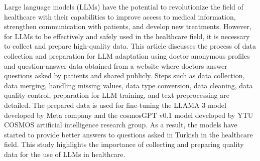 \sloppy
Large language models (LLMs) have the potential to revolutionize the field of healthcare with their capabilities to improve access to medical information, strengthen communication with patients, and develop new treatments. However, for LLMs to be effectively and safely used in the healthcare field, it is necessary to collect and prepare high-quality data. This article discusses the process of data collection and preparation for LLM adaptation using doctor anonymous profiles and question-answer data obtained from a website where doctors answer questions asked by patients and shared publicly. Steps such as data collection, data merging, handling missing values, data type conversion, data cleaning, data quality control, preparation for LLM training, and text preprocessing are detailed. The prepared data is used for fine-tuning the LLAMA 3 model developed by Meta company and the cosmosGPT v0.1 model developed by YTU COSMOS artificial intelligence research group. As a result, the models have started to provide better answers to questions asked in Turkish in the healthcare field. This study highlights the importance of collecting and preparing quality data for the use of LLMs in healthcare.